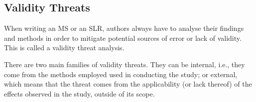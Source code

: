 






\subsection{Validity Threats}
\label{sub:validity_threats}

When writing an MS or an SLR, authors always have to analyse their
findings and methods in order to mitigate potential sources of error or
lack of validity. This is called a validity threat analysis.

There are two main families of validity threats. They can be internal,
i.e., they come from the methods employed used in conducting the study;
or external, which means that the threat comes from the applicability
(or lack thereof) of the effects observed in the study, outside of its
scope.

